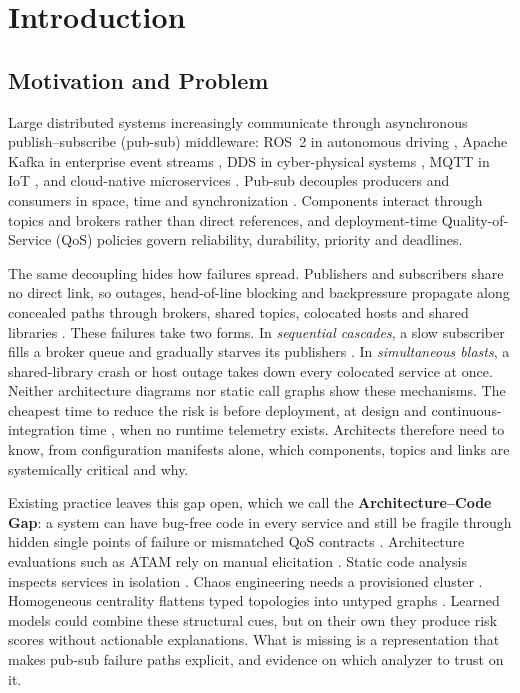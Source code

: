 \documentclass[preprint,3p]{elsarticle}
\begin{document}
\linenumbers

\section{Introduction}
\label{sec:1}

\subsection{Motivation and Problem}
\label{sec:1.1}

Large distributed systems increasingly communicate through asynchronous publish--subscribe (pub-sub) middleware: ROS~2 in autonomous driving \cite{macenski2022robot}, Apache Kafka in enterprise event streams \cite{kreps2011kafka}, DDS in cyber-physical systems \cite{omg2015dds}, MQTT in IoT \cite{oasis2019mqtt}, and cloud-native microservices \cite{dragoni2017microservices,newman2015building}. Pub-sub decouples producers and consumers in space, time and synchronization \cite{eugster2003faces}. Components interact through topics and brokers rather than direct references, and deployment-time Quality-of-Service (QoS) policies govern reliability, durability, priority and deadlines.

The same decoupling hides how failures spread. Publishers and subscribers share no direct link, so outages, head-of-line blocking and backpressure propagate along concealed paths through brokers, shared topics, colocated hosts and shared libraries \cite{motter2002cascade,buldyrev2010cascade}. These failures take two forms. In \emph{sequential cascades}, a slow subscriber fills a broker queue and gradually starves its publishers \cite{albert2000error}. In \emph{simultaneous blasts}, a shared-library crash or host outage takes down every colocated service at once. Neither architecture diagrams nor static call graphs show these mechanisms. The cheapest time to reduce the risk is before deployment, at design and continuous-integration time \cite{avizienis2004basic,bass2012software}, when no runtime telemetry exists. Architects therefore need to know, from configuration manifests alone, which components, topics and links are systemically critical and why.

Existing practice leaves this gap open, which we call the \textbf{Architecture--Code Gap}: a system can have bug-free code in every service and still be fragile through hidden single points of failure or mismatched QoS contracts \cite{perry1992foundations,garcia2009identifying}. Architecture evaluations such as ATAM rely on manual elicitation \cite{kazman1998atam}. Static code analysis inspects services in isolation \cite{sonarsource2024clean,chidamber1994metrics}. Chaos engineering needs a provisioned cluster \cite{basiri2016chaos}. Homogeneous centrality flattens typed topologies into untyped graphs \cite{freeman1977centrality,brandes2001faster}. Learned models could combine these structural cues, but on their own they produce risk scores without actionable explanations. What is missing is a representation that makes pub-sub failure paths explicit, and evidence on which analyzer to trust on it.
\end{document}
